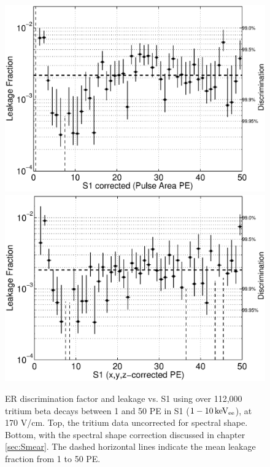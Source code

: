 \renewcommand{\baselinestretch}{1}
\small\normalsize
\begin{figure}[h!]\centering
\includegraphics[width=120mm]{Chapter_T/Figures/ER_Band/CH3T_Leakage_fid_50_rawSpec.eps}
\includegraphics[width=120mm]{Chapter_T/Figures/ER_Band/CH3T_Leakage_fid_50_.eps}
\caption{ER discrimination factor and leakage vs. S1 using over 112,000 tritium beta decays between 1 and 50 PE in S1 ($\rm1-10 \, keV_{ee}$), at 170 V/cm. Top, the tritium data uncorrected for spectral shape. Bottom, with the spectral shape correction discussed in chapter \ref{sec:Smear}. The dashed horizontal lines indicate the mean leakage fraction from 1 to 50 PE.}
\label{fig:Leak}
\end{figure}
\renewcommand{\baselinestretch}{2}
\small\normalsize

